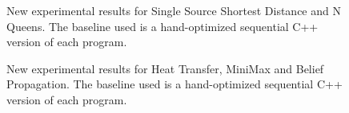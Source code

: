 \documentclass[10pt]{article}
\begin{document}
\begin{figure}[h]
\begin{center}
\end{center}
\caption{New experimental results for Single Source Shortest Distance and N
   Queens. The baseline used is a hand-optimized sequential C++ version of each
   program.}
\label{fig:res3}
\end{figure}

\begin{figure}[h]
\begin{center}
\end{center}
\begin{center}
\end{center}
\caption{New experimental results for Heat Transfer, MiniMax and Belief
   Propagation. The baseline used is a hand-optimized sequential C++ version of
   each program.}
\label{fig:res4}
\end{figure}
\end{document}
